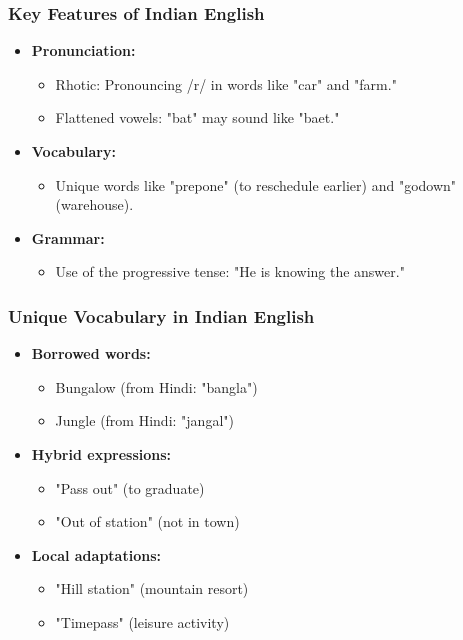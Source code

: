 \documentclass{beamer}
\begin{document}
\begin{frame}
\frametitle{Key Features of Indian English}
\begin{itemize}
    \item \textbf{Pronunciation:}
    \begin{itemize}
        \item Rhotic: Pronouncing /r/ in words like "car" and "farm."
        \item Flattened vowels: "bat" may sound like "baet."
    \end{itemize}
    \item \textbf{Vocabulary:}
    \begin{itemize}
        \item Unique words like "prepone" (to reschedule earlier) and "godown" (warehouse).
    \end{itemize}
    \item \textbf{Grammar:}
    \begin{itemize}
        \item Use of the progressive tense: "He is knowing the answer."
    \end{itemize}
\end{itemize}
\end{frame}

\begin{frame}
\frametitle{Unique Vocabulary in Indian English}
\begin{itemize}
    \item \textbf{Borrowed words:}
    \begin{itemize}
        \item Bungalow (from Hindi: "bangla")
        \item Jungle (from Hindi: "jangal")
    \end{itemize}
    \item \textbf{Hybrid expressions:}
    \begin{itemize}
        \item "Pass out" (to graduate)
        \item "Out of station" (not in town)
    \end{itemize}
    \item \textbf{Local adaptations:}
    \begin{itemize}
        \item "Hill station" (mountain resort)
        \item "Timepass" (leisure activity)
    \end{itemize}
\end{itemize}
\end{frame}
\end{document}
